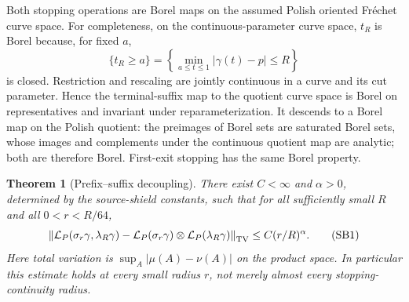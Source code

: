 \documentclass[11pt]{article}
\newtheorem{theorem}{Theorem}[section]
\theoremstyle{definition}\newtheorem{definition}[theorem]{Definition}
\theoremstyle{remark}\newtheorem{remark}[theorem]{Remark}
\begin{document}
Both stopping operations are Borel maps on the assumed Polish oriented
Fr\'echet curve space. For completeness, on the continuous-parameter
curve space, $t_R$ is Borel because, for fixed $a$,
\[
 \{t_R\geq a\}
 =\left\{\min_{a\leq t\leq1}|\gamma(t)-p|\leq R\right\}
\]
is closed. Restriction and rescaling are jointly continuous in a curve
and its cut parameter. Hence the terminal-suffix map to the quotient
curve space is Borel on representatives and invariant under
reparameterization. It descends to a Borel map on the Polish quotient:
the preimages of Borel sets are saturated Borel sets, whose images and
complements under the continuous quotient map are analytic; both are
therefore Borel. First-exit stopping has the same Borel property.

\begin{theorem}[Prefix--suffix decoupling]
\label{thm:spatial-beta}
There exist $C<\infty$ and $\alpha>0$, determined by the source-shield
constants, such that for all sufficiently small $R$ and all
$0<r<R/64$,
\[
 \left\|\mathcal L_P(\sigma_r\gamma,\lambda_R\gamma)
       -\mathcal L_P(\sigma_r\gamma)
           \otimes\mathcal L_P(\lambda_R\gamma)\right\|_{\rm TV}
 \leq C(r/R)^\alpha.
 \tag{SB1}
\]
Here total variation is $\sup_A|\mu(A)-\nu(A)|$ on the product
space. In particular this estimate holds at \emph{every} small radius
$r$, not merely almost every stopping-continuity radius.
\end{theorem}
\end{document}
